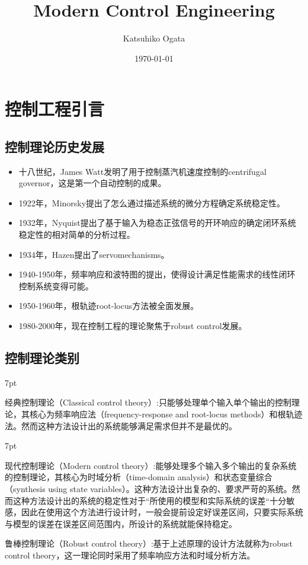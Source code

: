 \documentclass{article}
\title{Modern Control Engineering}
\author{Katsuhiko Ogata}%
\date{\today}
\numberwithin{equation}{section}
\numberwithin{figure}{section}
\newenvironment{formal}{%
\def\FrameCommand{%
\hspace{1pt}%
{\color{DarkBlue}\vrule width 2pt}%
{\color{formalshade}\vrule width 4pt}%
\colorbox{formalshade}%
}%
\MakeFramed{\advance\hsize-\width\FrameRestore}%
\noindent\hspace{-4.55pt}%
\begin{adjustwidth}{}{7pt}%
\vspace{2pt}\vspace{2pt}%
}
{%
\vspace{2pt}\end{adjustwidth}\endMakeFramed%
}
\begin{document}
\maketitle

\newpage

\section{控制工程引言}
\subsection{控制理论历史发展}
\begin{itemize}
    \item 十八世纪，James Watt发明了用于控制蒸汽机速度控制的centrifugal governor，这是第一个自动控制的成果。
    \item 1922年，Minorsky提出了怎么通过描述系统的微分方程确定系统稳定性。
    \item 1932年，Nyquist提出了基于输入为稳态正弦信号的开环响应的确定闭环系统稳定性的相对简单的分析过程。
    \item 1934年，Hazen提出了servomechanisms。
    \item 1940-1950年，频率响应和波特图的提出，使得设计满足性能需求的线性闭环控制系统变得可能。
    \item 1950-1960年，根轨迹root-locus方法被全面发展。
    \item 1980-2000年，现在控制工程的理论聚焦于robust control发展。
\end{itemize}
\subsection{控制理论类别}
\begin{formal}
    \item 经典控制理论（Classical control theory）:只能够处理单个输入单个输出的控制理论，其核心为频率响应法（frequency-response and root-locus methods）和根轨迹法。然而这种方法设计出的系统能够满足需求但并不是最优的。
    \item 
\end{formal}
\begin{formal}
    \item 现代控制理论（Modern control theory）:能够处理多个输入多个输出的复杂系统的控制理论，其核心为时域分析（time-domain analysis）和状态变量综合（synthesis using state variables）。这种方法设计出复杂的、要求严苛的系统。然而这种方法设计出的系统的稳定性对于“所使用的模型和实际系统的误差“十分敏感，因此在使用这个方法进行设计时，一般会提前设定好误差区间，只要实际系统与模型的误差在误差区间范围内，所设计的系统就能保持稳定。
    \item 鲁棒控制理论（Robust control theory）:基于上述原理的设计方法就称为robust control theory，这一理论同时采用了频率响应方法和时域分析方法。
\end{formal}
\end{document}
